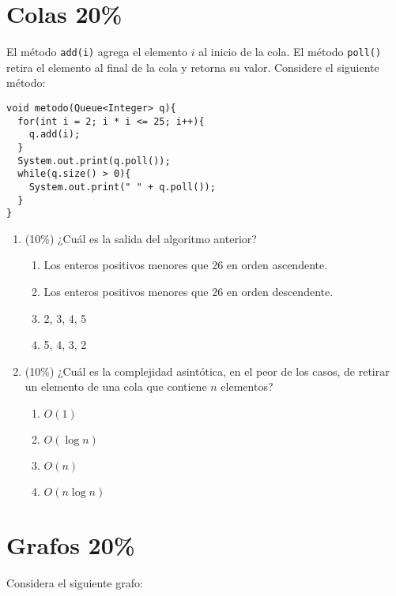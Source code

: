 \documentclass[10 pt]{article}
\begin{document}
\begin{multicols}{2}
\section{Colas 20\%}
El método \texttt{add(i)} agrega el elemento $i$ al inicio de la cola. El método \texttt{poll()} retira el elemento al final de la cola y retorna su valor. Considere el siguiente método:
\begin{lstlisting}
void metodo(Queue<Integer> q){
  for(int i = 2; i * i <= 25; i++){
    q.add(i);  
  }
  System.out.print(q.poll());
  while(q.size() > 0){
    System.out.print(" " + q.poll());
  }
}
\end{lstlisting}
\begin{enumerate}[label=\alph*]
\item (10\%) ¿Cuál es la salida del algoritmo anterior?
\begin{enumerate}[label=(\roman*)]
\item Los enteros positivos menores que 26 en orden ascendente.
\item Los enteros positivos menores que 26 en orden descendente.
\item 2, 3, 4, 5
\item 5, 4, 3, 2
\end{enumerate}
\item (10\%) ¿Cuál es la complejidad asintótica, en el peor de los casos, de retirar un elemento de una cola que contiene $n$ elementos?
\begin{enumerate}[label=(\roman*)]
\item $O(1)$
\item $O(\log n)$
\item $O(n)$
\item $O(n \log n)$
\end{enumerate}
\end{enumerate}
\section{Grafos 20\%}
Considera el siguiente grafo:
\\
\begin{center}
\end{center}
\end{multicols}
\end{document}
